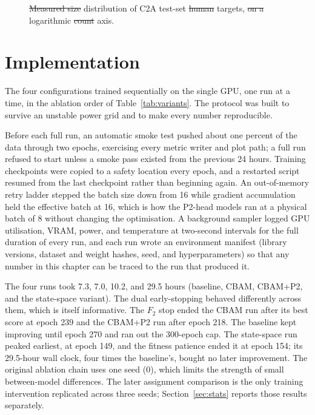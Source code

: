 \documentclass[12pt,a4paper,oneside]{report}
\providecommand{\DIFadd}[1]{{\protect\color{blue}\uwave{#1}}} %
\providecommand{\DIFdel}[1]{{\protect\color{red}\sout{#1}}}                      %
\providecommand{\DIFaddFL}[1]{\DIFadd{#1}} %
\providecommand{\DIFdelFL}[1]{\DIFdel{#1}} %
\providecommand{\DIFaddbeginFL}{} %
\providecommand{\DIFaddendFL}{} %
\providecommand{\DIFdelbeginFL}{} %
\providecommand{\DIFdelendFL}{} %
\begin{document}
\begin{figure}[tbp]

  \caption{\DIFdelbeginFL \DIFdelFL{Measured size }\DIFdelendFL \DIFaddbeginFL \DIFaddFL{Size }\DIFaddendFL distribution of C2A test-set \DIFdelbeginFL \DIFdelFL{human }\DIFdelendFL targets, \DIFdelbeginFL \DIFdelFL{on a
  }\DIFdelendFL logarithmic \DIFdelbeginFL \DIFdelFL{count }\DIFdelendFL axis.}
  \label{fig:sizedist}
\end{figure}

\section{Implementation}
\label{sec:protocol}
The four configurations trained sequentially on the single GPU, one run at a
time, in the ablation order of Table~\ref{tab:variants}. The protocol was
built to survive an unstable power grid and to make every number reproducible.

Before each full run, an automatic smoke test pushed about one percent of the
data through two epochs, exercising every metric writer and plot path; a full
run refused to start unless a smoke pass existed from the previous 24 hours.
Training checkpoints were copied to a safety location every epoch, and a
restarted script resumed from the last checkpoint rather than beginning
again. An out-of-memory retry ladder stepped the batch size down from 16
while gradient accumulation held the effective batch at 16, which is how the
P2-head models ran at a physical batch of 8 without changing the
optimisation. A background sampler logged GPU utilisation, VRAM, power, and
temperature at two-second intervals for the full duration of every run, and
each run wrote an environment manifest (library versions, dataset and weight
hashes, seed, and hyperparameters) so that any number in this chapter can be
traced to the run that produced it.

The four runs took 7.3, 7.0, 10.2, and 29.5 hours (baseline, CBAM, CBAM+P2,
and the state-space variant). The dual early-stopping behaved differently
across them, which is itself informative. The $F_2$ stop ended the CBAM run
after its best score at epoch 239 and the CBAM+P2 run after epoch 218. The
baseline kept improving until epoch 270 and ran out the 300-epoch cap. The
state-space run peaked earliest, at epoch 149, and the fitness patience ended
it at epoch 154; its 29.5-hour wall clock, four times the baseline's, bought
no later improvement. The original ablation chain uses one seed (0), which
limits the strength of small between-model differences. The later assignment
comparison is the only training intervention replicated across three seeds;
Section~\ref{sec:stats} reports those results separately.
\end{document}
